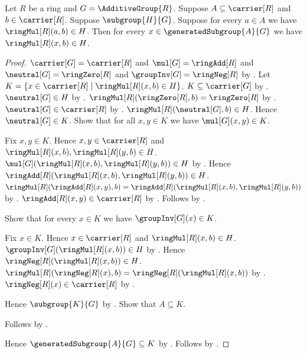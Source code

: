 \begin{lemma}\label{generated_subgroup_closed_under_right_ring_multiplication}
    Let $R$ be a ring and $G=\AdditiveGroup{R}$.
    Suppose $A\subseteq\carrier[R]$ and $b\in\carrier[R]$.
    Suppose $\subgroup{H}{G}$.
    Suppose for every $a\in A$ we have $\ringMul[R](a,b)\in H$.
    Then for every $x\in\generatedSubgroup{A}{G}$ we have
        $\ringMul[R](x,b)\in H$.
\end{lemma}
\begin{proof}
    $\carrier[G]=\carrier[R]$ and
        $\mul[G]=\ringAdd[R]$ and
        $\neutral[G]=\ringZero[R]$ and
        $\groupInv[G]=\ringNeg[R]$ by
        .
    Let $K=\{x\in\carrier[R]\mid \ringMul[R](x,b)\in H\}$.
    $K\subseteq\carrier[G]$ by .
    $\neutral[G]\in H$ by .
    $\ringMul[R](\ringZero[R],b)=\ringZero[R]$ by
        .
    $\neutral[G]\in\carrier[R]$ by .
    $\ringMul[R](\neutral[G],b)\in H$.
    Hence $\neutral[G]\in K$.
    Show that for all $x,y\in K$ we have $\mul[G](x,y)\in K$.
    \begin{subproof}
        Fix $x,y\in K$.
        Hence $x,y\in\carrier[R]$ and
            $\ringMul[R](x,b),\ringMul[R](y,b)\in H$.
        $\mul[G](\ringMul[R](x,b),\ringMul[R](y,b))\in H$ by
            .
        Hence $\ringAdd[R](\ringMul[R](x,b),\ringMul[R](y,b))\in H$.
        $\ringMul[R](\ringAdd[R](x,y),b)
            =\ringAdd[R](\ringMul[R](x,b),\ringMul[R](y,b))$ by
            .
        $\ringAdd[R](x,y)\in\carrier[R]$ by .
        Follows by \auto.
    \end{subproof}
    Show that for every $x\in K$ we have $\groupInv[G](x)\in K$.
    \begin{subproof}
        Fix $x\in K$.
        Hence $x\in\carrier[R]$ and $\ringMul[R](x,b)\in H$.
        $\groupInv[G](\ringMul[R](x,b))\in H$ by
            .
        Hence $\ringNeg[R](\ringMul[R](x,b))\in H$.
        $\ringMul[R](\ringNeg[R](x),b)
            =\ringNeg[R](\ringMul[R](x,b))$ by
            .
        $\ringNeg[R](x)\in\carrier[R]$ by .
    \end{subproof}
    Hence $\subgroup{K}{G}$ by .
    Show that $A\subseteq K$.
    \begin{subproof}
        Follows by .
    \end{subproof}
    Hence $\generatedSubgroup{A}{G}\subseteq K$ by
        .
    Follows by .
\end{proof}

